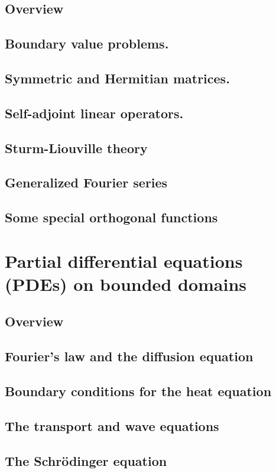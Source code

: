 \documentclass{article}
\begin{document}
\subsection*{Overview}
\subsection{Boundary value problems.}
\subsection{Symmetric and Hermitian matrices.}
\subsection{Self-adjoint linear operators.}
\subsection{Sturm-Liouville theory}
\subsection{Generalized Fourier series}
\subsection{Some special orthogonal functions}
\pagebreak
\section{Partial differential equations (PDEs) on bounded domains}
\subsection*{Overview}
\subsection{Fourier's law and the diffusion equation}
\subsection{Boundary conditions for the heat equation}
\subsection{The transport and wave equations}
\subsection{The Schrödinger equation}
\pagebreak
\end{document}
